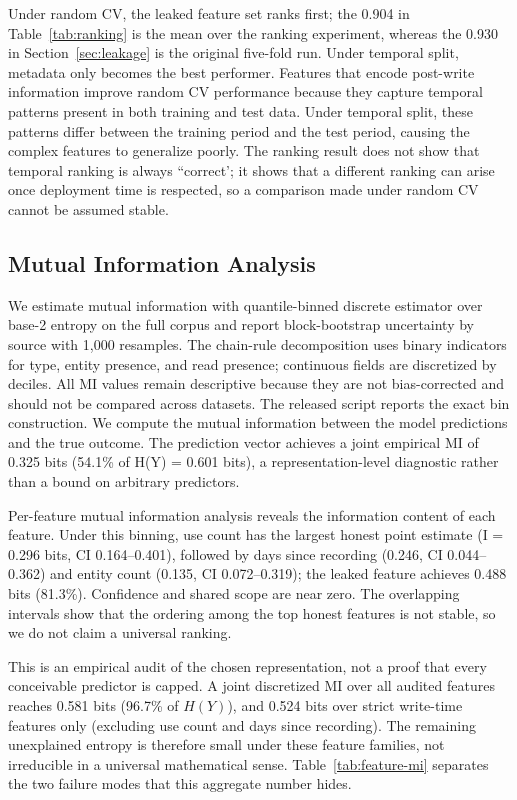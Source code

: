 \documentclass[sigconf,nonacm]{acmart}
\begin{document}
Under random CV, the leaked feature set ranks first; the 0.904 in Table~\ref{tab:ranking} is the mean over the ranking experiment, whereas the 0.930 in Section~\ref{sec:leakage} is the original five-fold run. Under temporal split, metadata only becomes the best performer. Features that encode post-write information improve random CV performance because they capture temporal patterns present in both training and test data. Under temporal split, these patterns differ between the training period and the test period, causing the complex features to generalize poorly. The ranking result does not show that temporal ranking is always ``correct'; it shows that a different ranking can arise once deployment time is respected, so a comparison made under random CV cannot be assumed stable.

\subsection{Mutual Information Analysis}
\label{sec:mi}

We estimate mutual information with quantile-binned discrete estimator over base-2 entropy on the full corpus and report block-bootstrap uncertainty by source with 1,000 resamples. The chain-rule decomposition uses binary indicators for type, entity presence, and read presence; continuous fields are discretized by deciles. All MI values remain descriptive because they are not bias-corrected and should not be compared across datasets. The released script reports the exact bin construction. We compute the mutual information between the model predictions and the true outcome. The prediction vector achieves a joint empirical MI of 0.325 bits (54.1\% of H(Y) = 0.601 bits), a representation-level diagnostic rather than a bound on arbitrary predictors.

Per-feature mutual information analysis reveals the information content of each feature. Under this binning, use count has the largest honest point estimate (I = 0.296 bits, CI 0.164--0.401), followed by days since recording (0.246, CI 0.044--0.362) and entity count (0.135, CI 0.072--0.319); the leaked feature achieves 0.488 bits (81.3\%). Confidence and shared scope are near zero. The overlapping intervals show that the ordering among the top honest features is not stable, so we do not claim a universal ranking.

This is an empirical audit of the chosen representation, not a proof that every conceivable predictor is capped. A joint discretized MI over all audited features reaches 0.581 bits (96.7\% of $H(Y)$), and 0.524 bits over strict write-time features only (excluding use count and days since recording). The remaining unexplained entropy is therefore small under these feature families, not irreducible in a universal mathematical sense.
Table~\ref{tab:feature-mi} separates the two failure modes that this aggregate number hides.
\end{document}
